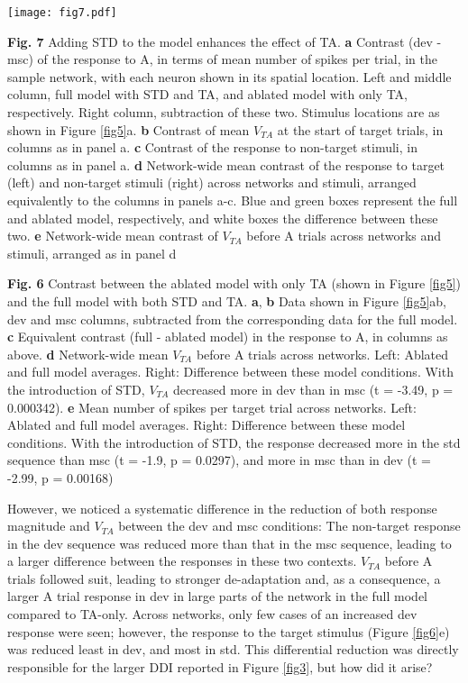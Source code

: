 \documentclass[pdflatex,referee,iicol,sn-basic]{sn-jnl}
\theoremstyle{thmstyleone}%
\theoremstyle{thmstyletwo}%
\theoremstyle{thmstylethree}%
\begin{document}
\begin{figure*}%
    \centering
    \texttt{[image: fig7.pdf]}
    \caption{}
    \label{fig7}
\end{figure*}
\textbf{Fig. 7} Adding STD to the model enhances the effect of TA.
\textbf{a} Contrast (dev - msc) of the response to A, in terms of mean number of spikes per trial, in the sample network, with each neuron shown in its spatial location. Left and middle column, full model with STD and TA, and ablated model with only TA, respectively. Right column, subtraction of these two. Stimulus locations are as shown in Figure \ref{fig5}a.
\textbf{b} Contrast of mean $V_{TA}$ at the start of target trials, in columns as in panel a.
\textbf{c} Contrast of the response to non-target stimuli, in columns as in panel a.
\textbf{d} Network-wide mean contrast of the response to target (left) and non-target stimuli (right) across networks and stimuli, arranged equivalently to the columns in panels a-c. Blue and green boxes represent the full and ablated model, respectively, and white boxes the difference between these two.
\textbf{e} Network-wide mean contrast of $V_{TA}$ before A trials across networks and stimuli, arranged as in panel d

\textbf{Fig. 6} Contrast between the ablated model with only TA (shown in Figure \ref{fig5}) and the full model with both STD and TA. \textbf{a}, \textbf{b} Data shown in Figure \ref{fig5}ab, dev and msc columns, subtracted from the corresponding data for the full model. \textbf{c} Equivalent contrast (full - ablated model) in the response to A, in columns as above. \textbf{d} Network-wide mean $V_{TA}$ before A trials across networks. Left: Ablated and full model averages. Right: Difference between these model conditions. With the introduction of STD, $V_{TA}$ decreased more in dev than in msc (t = -3.49, p = 0.000342). \textbf{e} Mean number of spikes per target trial across networks. Left: Ablated and full model averages. Right: Difference between these model conditions. With the introduction of STD, the response decreased more in the std sequence than msc (t = -1.9, p = 0.0297), and more in msc than in dev (t = -2.99, p = 0.00168)

However, we noticed a systematic difference in the reduction of both response magnitude and $V_{TA}$ between the dev and msc conditions: The non-target response in the dev sequence was reduced more than that in the msc sequence, leading to a larger difference between the responses in these two contexts. $V_{TA}$ before A trials followed suit, leading to stronger de-adaptation and, as a consequence, a larger A trial response in dev in large parts of the network in the full model compared to TA-only. Across networks, only few cases of an increased dev response were seen; however, the response to the target stimulus (Figure \ref{fig6}e) was reduced least in dev, and most in std. This differential reduction was directly responsible for the larger DDI reported in Figure \ref{fig3}, but how did it arise?
\end{document}
